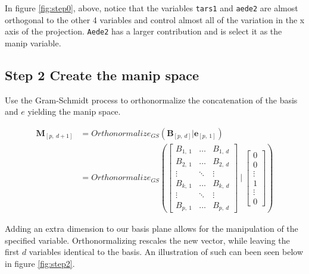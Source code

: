 \documentclass{monashthesis}
\begin{document}
In figure \ref{fig:step0}, above, notice that the variables
\texttt{tars1} and \texttt{aede2} are almost orthogonal to the other 4
variables and control almost all of the variation in the x axis of the
projection. \texttt{Aede2} has a larger contribution and is select it as
the manip variable.

\subsection{Step 2 Create the manip
space}\label{step-2-create-the-manip-space}

Use the Gram-Schmidt process to orthonormalize the concatenation of the
basis and \(e\) yielding the manip space.

\begin{align*}
  \textbf{M}_{[p,~d+1]}
  &= Orthonormalize_{GS}( \textbf{B}_{[p,~d]}|\textbf{e}_{[p,~1]} ) \\
  &= Orthonormalize_{GS}
  \left(
    \begin{bmatrix}
      B_{1,~1} & \dots  & B_{1,~d} \\
      B_{2,~1} & \dots  & B_{2,~d} \\
      \vdots   & \ddots & \vdots   \\
      B_{k,~1} & \dots  & B_{k,~d} \\
      \vdots   & \ddots & \vdots   \\
      B_{p,~1} & \dots  & B_{p,~d}
    \end{bmatrix}
  ~|~
    \begin{bmatrix}
      0 \\
      0 \\
      \vdots \\
      1 \\
      \vdots \\
      0
    \end{bmatrix}
  \right)
\end{align*}

Adding an extra dimension to our basis plane allows for the manipulation
of the specified variable. Orthonormalizing rescales the new vector,
while leaving the first \(d\) variables identical to the basis. An
illustration of such can been seen below in figure \ref{fig:step2}.
\end{document}
